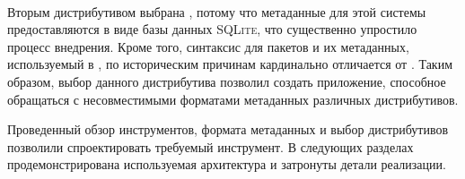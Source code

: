 \paragraph{\fedora}
Вторым дистрибутивом выбрана {\fedora}, потому что метаданные для этой системы предоставляются в виде базы данных \textsc{SQLite}, что существенно упростило процесс внедрения.
Кроме того, синтаксис для пакетов и их метаданных, используемый в {\fedora}, по историческим причинам кардинально отличается от {\debian}. Таким образом, выбор данного дистрибутива позволил создать приложение, способное обращаться с несовместимыми форматами метаданных различных дистрибутивов.

Проведенный обзор инструментов, формата метаданных и выбор дистрибутивов позволили спроектировать требуемый инструмент.
В следующих разделах продемонстрирована используемая архитектура и затронуты детали реализации.
